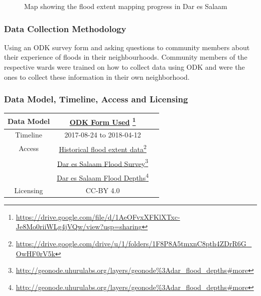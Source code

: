 \documentclass[a4paper,12pt,twoside]{article}
\begin{document}
\begin{figure}[h]
  \color{RHgreen}\caption{Map showing the flood extent mapping progress in Dar es Salaam}
  \centering
\end{figure}

\subsubsection{Data Collection Methodology}
Using an ODK survey form and asking questions to community members about their experience of floods in their neighbourhoods. Community members of the respective wards were trained on how to collect data using ODK and were the ones to collect these information in their own neighborhood.

\medskip
\subsubsection{Data Model, Timeline, Access and Licensing}
\begin{center}
\begin{tabular}{|c|c|c|}  
\hline
Data Model &  \href{https://drive.google.com/file/d/1AeOFvxXFKlXTxc-Je8Mo0riiWLg4jVQw/view?usp=sharing
}{ODK Form Used} \footnote{\url{https://drive.google.com/file/d/1AeOFvxXFKlXTxc-Je8Mo0riiWLg4jVQw/view?usp=sharing}} \\
 \hline
  Timeline  &  2017-08-24 to 2018-04-12 \\
\hline  
 Access  & 
    \href{https://drive.google.com/drive/u/1/folders/1F8P8A5tmxnC8pth4ZDrR6G_OwHF0rV5k}{Historical flood extent data}\footnote{\url{https://drive.google.com/drive/u/1/folders/1F8P8A5tmxnC8pth4ZDrR6G_OwHF0rV5k}}\\
{} & 
    \href{http://geonode.uhurulabs.org/layers/geonode\%3Adar_flood_depths#more}{Dar es Salaam Flood Survey}\footnote{\url{http://geonode.uhurulabs.org/layers/geonode\%3Adar_flood_depths#more}}\\
 {} &    
     \href{http://geonode.uhurulabs.org/layers/geonode\%3Adar_flood_depths#more}{Dar es Salaam Flood Depths}\footnote{\url{http://geonode.uhurulabs.org/layers/geonode\%3Adar_flood_depths#more}} \\
\hline
Licensing   &  CC-BY 4.0 \\
\hline
\end{tabular}
\end{center}
\end{document}
